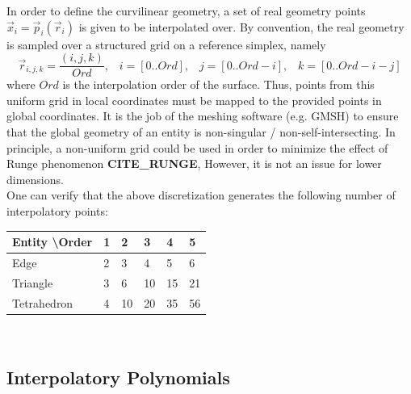 \noindent
In order to define the curvilinear geometry, a set of real geometry points $\vec{x}_i = \vec{p}_i(\vec{r}_i)$ is given to be interpolated over. By convention, the real geometry is sampled over a structured grid on a reference simplex, namely
\[\vec{r}_{i,j,k} = \frac{(i,j,k)}{Ord}, \;\;\; i=[0..Ord], \;\;\; j=[0..Ord-i], \;\;\; k=[0..Ord-i-j]\]
where $Ord$ is the interpolation order of the surface. Thus, points from this uniform grid in local coordinates must be mapped to the provided points in global coordinates. It is the job of the meshing software (e.g. GMSH\citeGMSH{}) to ensure that the global geometry of an entity is non-singular / non-self-intersecting. In principle, a non-uniform grid could be used in order to minimize the effect of Runge phenomenon \textbf{CITE\_RUNGE}, However, it is not an issue for lower dimensions. \\

\noindent
One can verify that the above discretization generates the following number of interpolatory points: \\

\noindent
\begin{tabular}{l l l l l l}
\hline
  Entity \textbackslash Order & 1 & 2  & 3  & 4  & 5 \\ \hline
  Edge                        & 2 & 3  & 4  & 5  & 6 \\
  Triangle                    & 3 & 6  & 10 & 15 & 21 \\
  Tetrahedron                 & 4 & 10 & 20 & 35 & 56 \\
\end{tabular} \\


\subsection{Interpolatory Polynomials}
\label{theory-lagrange-polynomials}

